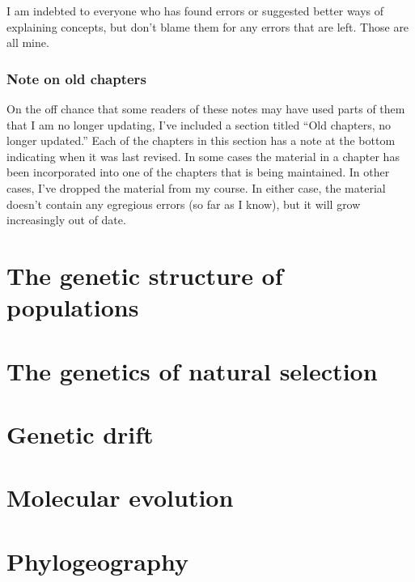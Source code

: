 \documentclass[12pt,titlepage,openright]{book}
\begin{document}
I am indebted to everyone who has found errors or suggested better
ways of explaining concepts, but don't blame them for any errors that
are left. Those are all mine.

\section*{Note on old chapters}

On the off chance that some readers of these notes may have used parts
of them that I am no longer updating, I've included a section titled
``Old chapters, no longer updated.'' Each of the chapters in this
section has a note at the bottom indicating when it was last
revised. In some cases the material in a chapter has been incorporated
into one of the chapters that is being maintained. In other cases,
I've dropped the material from my course. In either case, the material
doesn't contain any egregious errors (so far as I know), but it will
grow increasingly out of date.

\newpage
{}
\part{The genetic structure of populations}







\part{The genetics of natural selection}




\part{Genetic drift}






\part{Molecular evolution}





\part{Phylogeography}
\end{document}
